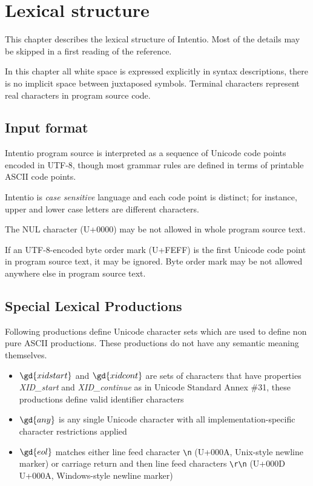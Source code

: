 \chapter{Lexical structure}

This chapter describes the lexical structure of Intentio. Most of the details may be skipped in a first reading of the reference.

In this chapter all white space is expressed explicitly in syntax descriptions, there is no implicit space between juxtaposed symbols. Terminal characters represent real characters in program source code.

\section{Input format}

Intentio program source is interpreted as a sequence of Unicode code points encoded in UTF-8, though most grammar rules are defined in terms of printable ASCII code points.

Intentio is \emph{case sensitive} language and each code point is distinct; for instance, upper and lower case letters are different characters.

The NUL character (U+0000) may be not allowed in whole program source text.

If an UTF-8-encoded byte order mark (U+FEFF) is the first Unicode code point in program source text, it may be ignored. Byte order mark may be not allowed anywhere else in program source text.

\section{Special Lexical Productions}

Following productions define Unicode character sets which are used to define non pure ASCII productions. These productions do not have any semantic meaning themselves.

\begin{bnfutils}
\begin{itemize}
  \item \(\gd{xidstart}\) and \(\gd{xidcont}\) are sets of characters that have properties \emph{XID\_start} and \emph{XID\_continue} as in Unicode Standard Annex \#31\cite{UAX31}, these productions define valid identifier characters
  \item \(\gd{any}\) is any single Unicode character with all implementation-specific character restrictions applied
  \item \(\gd{eol}\) matches either line feed character \texttt{\textbackslash n} (U+000A, Unix-style newline marker) or carriage return and then line feed characters \texttt{\textbackslash r\textbackslash n} (U+000D U+000A, Windows-style newline marker)
\end{itemize}
\end{bnfutils}

